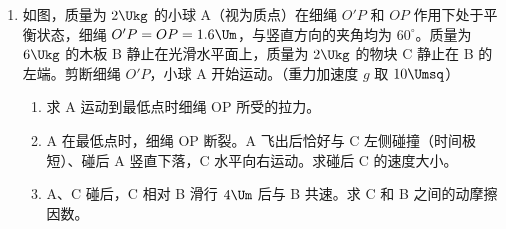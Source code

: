 \documentclass[\gkver]{gaokaozhenti}
\begin{document}
\begin{enumerate}
{对气体 B 分析，若体积不变的情况下抽去一半的气体，则压强变为原来的一半即 $\frac{1}{2}p_{0}$，则根据玻意耳定律得

$\frac{1}{2}p_{0}V = p_{B}\frac{3}{4}V$

解得 $p_{B} = \frac{2}{3}p_{0}$

（2）由题意可知，弹簧的压缩量为 $\frac{l}{4}$，对活塞受力分析有

$p_{A}S = p_{B}S + F$

根据胡克定律得 $F = k\frac{l}{4}$

联立得 $k = \frac{8p_{0}S}{15l}$
}

\item
如图，质量为 $2 \Ukg$ 的小球 A（视为质点）在细绳 $O'P$ 和 $OP$ 作用下处于平衡状态，细绳 $O'P = OP = 1.6 \Um$，与竖直方向的夹角均为 $60^{\circ}$。质量为 $6 \Ukg$ 的木板 B 静止在光滑水平面上，质量为 $2 \Ukg$ 的物块 C 静止在 B 的左端。剪断细绳 $O'P$，小球 A 开始运动。（重力加速度 $g$ 取 $10 \Umsq$）
\begin{enumerate}
	\item
	求 A 运动到最低点时细绳 OP 所受的拉力。
	\item
	A 在最低点时，细绳 OP 断裂。A 飞出后恰好与 C 左侧碰撞（时间极短）、碰后 A 竖直下落，C 水平向右运动。求碰后 C 的速度大小。
	\item
	A、C 碰后，C 相对 B 滑行 $4 \Um$ 后与 B 共速。求 C 和 B 之间的动摩擦因数。
\end{enumerate}

\end{enumerate}
\end{document}
